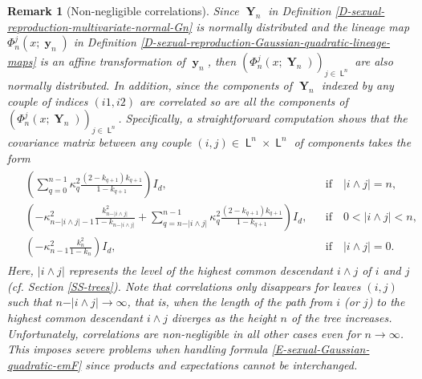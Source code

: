 \documentclass[reqno]{amsart}
\newtheorem{remark}[definition]{Remark}
\DeclareMathOperator{\Leaves}{\mathsf{L}}
\DeclareMathOperator{\by}{\mathbf{y}}
\DeclareMathOperator{\bY}{\mathbf{Y}}
\numberwithin{equation}{section}
\begin{document}
{\begin{remark}[Non-negligible correlations]
Since $\bY_n$ in Definition \ref{D-sexual-reproduction-multivariate-normal-Gn} is normally distributed and the lineage map $\Phi^j_n(x;\by_n)$ in Definition \ref{D-sexual-reproduction-Gaussian-quadratic-lineage-maps} is an affine transformation of $\by_n$, then $(\Phi^j_n(x;\bY_n))_{j\in \Leaves^n}$ are also normally distributed. In addition, since the components of $\bY_n$ indexed by any couple of indices $(i1,i2)$ are correlated so are all the components of $(\Phi^j_n(x;\bY_n))_{j\in \Leaves^n}$. Specifically, a straightforward computation shows that the covariance matrix between any couple $(i,j)\in \Leaves^n\times \Leaves^n$ of components takes the form
\begin{align*}
\begin{aligned}
&\left(\sum_{q=0}^{n-1}\kappa_q^2\frac{(2-k_{q+1})k_{q+1}}{1-k_{q+1}}\right)I_d, & & \mbox{if}\quad \vert i\wedge j\vert=n,\\
&\left(-\kappa_{n-\vert i\wedge j\vert-1}^2\frac{k_{n-\vert i\wedge j\vert}^2}{1-k_{n-\vert i\wedge j\vert}}+\sum_{q=n-\vert i\wedge j\vert}^{n-1} \kappa_q^2\frac{(2-k_{q+1})k_{q+1}}{1-k_{q+1}}\right) I_d, & & \mbox{if}\quad 0<\vert i\wedge j\vert<n,\\
&\left(-\kappa_{n-1}^2\frac{k_n^2}{1-k_n}\right) I_d, & & \mbox{if}\quad \vert i\wedge j\vert=0.
\end{aligned}
\end{align*}
Here, $\vert i\wedge j\vert$ represents the level of the highest common descendant $i\wedge j$ of $i$ and $j$ ({\em cf.} Section \ref{SS-trees}). Note that correlations only disappears for leaves $(i,j)$ such that $n-\vert i\wedge j\vert\rightarrow\infty$, that is, when the length of the path from $i$ (or $j$) to the highest common descendant $i\wedge j$ diverges as the height $n$ of the tree increases. Unfortunately, correlations are non-negligible in all other cases even for $n\rightarrow\infty$. This imposes severe problems when handling formula \eqref{E-sexual-Gaussian-quadratic-emF} since products and expectations cannot be interchanged.
\end{remark}


}
\end{document}

